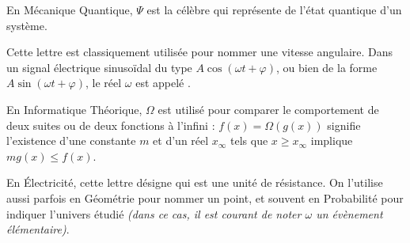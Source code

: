 \cadre{$\Psi$} En Mécanique Quantique, $\Psi$ est la célèbre  qui représente de l'état quantique d'un système.


\cadre{$\omega$} Cette lettre est classiquement utilisée pour nommer une vitesse angulaire. Dans un signal électrique sinusoïdal du type $A\cos(\omega t + \varphi)$, ou bien de la forme $A\sin(\omega t + \varphi)$, le réel $\omega$ est appelé .


\cadre{$\Omega$}  En Informatique Théorique, $\Omega$ est utilisé pour comparer le comportement de deux suites ou de deux fonctions à l'infini : $f(x) = \Omega\left(g(x)\right)$ signifie l'existence d'une constante $m$ et d'un réel $x_\infty$ tels que $x \geqslant x_\infty$
implique $m g(x) \leqslant f(x)$.

En Électricité, cette lettre désigne  qui est une unité de résistance. On l'utilise aussi parfois en Géométrie pour nommer un point, et souvent en Probabilité pour indiquer l'univers étudié \emph{(dans ce cas, il est courant de noter $\omega$ un évènement élémentaire)}.
